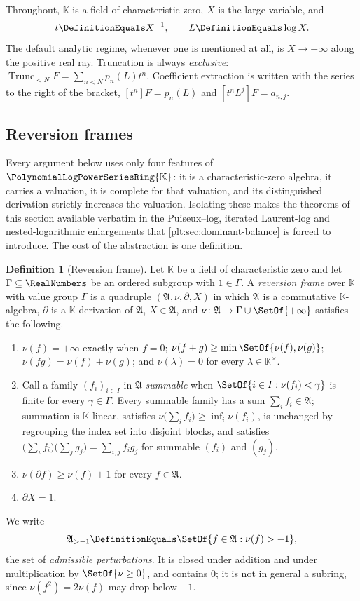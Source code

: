 \documentclass[11pt,oneside]{article}
\theoremstyle{plain}
\theoremstyle{definition}
\newtheorem{definition}[theorem]{Definition}
\theoremstyle{remark}
\newcommand{\K}{\mathbb{K}}
\newcommand{\PLpow}{\PolynomialLogPowerSeriesRing{\K}}   %
\newcommand{\Trunc}[2]{\operatorname{Trunc}_{<#2}#1}     %
\begin{document}
Throughout, \(\K\) is a field of characteristic zero, \(X\) is the large
variable, and
\[
  t\DefinitionEquals X^{-1},
  \qquad
  L\DefinitionEquals\log X .
\]
The default analytic regime, whenever one is mentioned at all, is
\(X\to+\infty\) along the positive real ray.  Truncation is always
\emph{exclusive}: \(\Trunc{F}{N}=\sum_{n<N}p_n(L)t^n\).  Coefficient extraction
is written with the series to the right of the bracket, \([t^n]F=p_n(L)\) and
\([t^nL^j]F=a_{n,j}\).

\subsection{Reversion frames}
\label{plt:sec:lag-frames}

Every argument below uses only four features of \(\PLpow\): it is a
characteristic-zero algebra, it carries a valuation, it is complete for that
valuation, and its distinguished derivation strictly increases the valuation.
Isolating these makes the theorems of this section available verbatim in the
Puiseux--log, iterated Laurent-log and nested-logarithmic enlargements that
\cref{plt:sec:dominant-balance} is forced to introduce.  The cost of the
abstraction is one definition.

\begin{definition}[Reversion frame]
\label{plt:def:lag-frame}
Let \(\K\) be a field of characteristic zero and let \(\Gamma\subseteq\RealNumbers\)
be an ordered subgroup with \(1\in\Gamma\).  A \emph{reversion frame} over
\(\K\) with value group \(\Gamma\) is a quadruple
\((\mathfrak A,\nu,\partial,X)\) in which \(\mathfrak A\) is a commutative
\(\K\)-algebra, \(\partial\) is a \(\K\)-derivation of \(\mathfrak A\),
\(X\in\mathfrak A\), and
\(\nu\colon\mathfrak A\to\Gamma\cup\SetOf{+\infty}\) satisfies the following.
\begin{enumerate}
\item[(F1)] \(\nu(f)=+\infty\) exactly when \(f=0\);
      \(\nu(f+g)\ge\min\SetOf{\nu(f),\nu(g)}\); \(\nu(fg)=\nu(f)+\nu(g)\); and
      \(\nu(\lambda)=0\) for every \(\lambda\in\K^\times\).
\item[(F2)] Call a family \((f_i)_{i\in I}\) in \(\mathfrak A\)
      \emph{summable} when \(\SetOf{i\in I:\nu(f_i)<\gamma}\) is finite for
      every \(\gamma\in\Gamma\).  Every summable family has a sum
      \(\sum_{i}f_i\in\mathfrak A\); summation is \(\K\)-linear, satisfies
      \(\nu\bigl(\sum_if_i\bigr)\ge\inf_i\nu(f_i)\), is unchanged by
      regrouping the index set into disjoint blocks, and satisfies
      \(\bigl(\sum_if_i\bigr)\bigl(\sum_jg_j\bigr)=\sum_{i,j}f_ig_j\) for
      summable \((f_i)\) and \((g_j)\).
\item[(F3)] \(\nu(\partial f)\ge\nu(f)+1\) for every \(f\in\mathfrak A\).
\item[(F4)] \(\partial X=1\).
\end{enumerate}
We write
\[
  \mathfrak A_{>-1}\DefinitionEquals\SetOf{f\in\mathfrak A:\nu(f)>-1},
\]
the set of \emph{admissible perturbations}.  It is closed under addition and
under multiplication by \(\SetOf{\nu\ge0}\), and contains \(0\); it is not in
general a subring, since \(\nu(f^2)=2\nu(f)\) may drop below \(-1\).
\end{definition}
\end{document}

